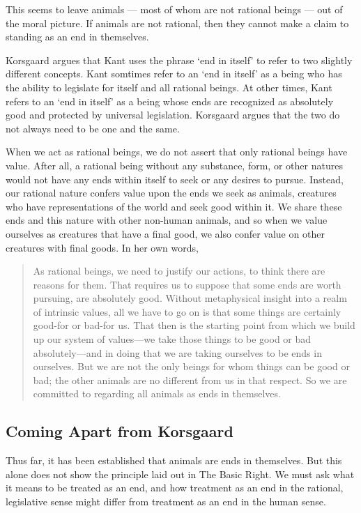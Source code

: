 \documentclass[12pt]{article}
\begin{document}
	This seems to leave animals --- most of whom are not rational beings ---
	out of the moral picture.  If animals are not rational, then they cannot
	make a claim to standing as an end in themselves.

	Korsgaard argues that Kant uses the phrase ‘end in itself’ to refer to two
	slightly different concepts.  Kant somtimes refer to an ‘end in itself’ as
	a being who has the ability to legislate for itself and all rational
	beings.  At other times, Kant refers to an ‘end in itself’ as a being whose
	ends are recognized as absolutely good and protected by universal
	legislation.  Korsgaard argues that the two do not always need to be one
	and the same.

	When we act as rational beings, we do not assert that only rational beings
	have value.  After all, a rational being without any substance, form, or
	other natures would not have any ends within itself to seek or any desires
	to pursue.  Instead, our rational nature confers value upon the ends we
	seek as animals, creatures who have representations of the world and seek
	good within it.  We share these ends and this nature with other non-human
	animals, and so when we value ourselves as creatures that have a final
	good, we also confer value on other creatures with final goods.  In her own
	words,

	\begin{quote} As rational beings, we need to justify our actions, to think
		there are reasons for them. That requires us to suppose that some ends
		are worth pursuing, are absolutely good. Without metaphysical insight
		into a realm of intrinsic values, all we have to go on is that some
		things are certainly good-for or bad-for us. That then is the starting
		point from which we build up our system of values—we take those things
		to be good or bad absolutely—and in doing that we are taking ourselves
		to be ends in ourselves.  But we are not the only beings for whom
		things can be good or bad; the other animals are no different from us
		in that respect. So we are committed to regarding all animals as ends
		in themselves.\autocite[8.5.5]{kors} \end{quote}

		\subsection{Coming Apart from Korsgaard}

		Thus far, it has been established that animals are ends in themselves.
		But this alone does not show the principle laid out in The Basic Right.
		We must ask what it means to be treated as an end, and how treatment as
		an end in the rational, legislative sense might differ from treatment
		as an end in the human sense.
\end{document}
